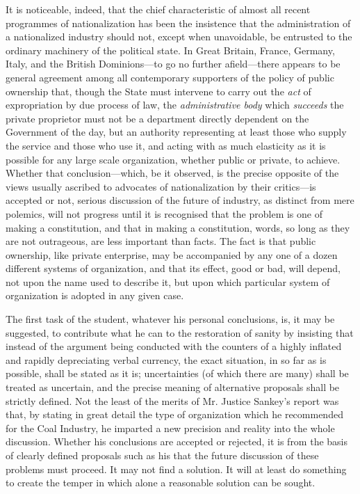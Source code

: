 \documentclass{book}
\begin{document}
It is noticeable, indeed, that the chief characteristic of almost all recent programmes of nationalization has been the insistence that the administration of a nationalized industry should not, except when unavoidable, be entrusted to the ordinary machinery of the political state. In Great Britain, France, Germany, Italy, and the British Dominions—to go no further afield—there appears to be general agreement among all contemporary supporters of the policy of public ownership that, though the State must intervene to carry out the \emph{act} of expropriation by due process of law, the \emph{administrative body} which \emph{succeeds} the private proprietor must not be a department directly dependent on the Government of the day, but an authority representing at least those who supply the service and those who use it, and acting with as much elasticity as it is possible for any large scale organization, whether public or private, to achieve. Whether that conclusion—which, be it observed, is the precise opposite of the views usually ascribed to advocates of nationalization by their critics—is accepted or not, serious discussion of the future of industry, as distinct from mere polemics, will not progress until it is recognised that the problem is one of making a constitution, and that in making a constitution, words, so long as they are not outrageous, are less important than facts. The fact is that public ownership, like private enterprise, may be accompanied by any one of a dozen different systems of organization, and that its effect, good or bad, will depend, not upon the name used to describe it, but upon which particular system of organization is adopted in any given case.

The first task of the student, whatever his personal conclusions, is, it may be suggested, to contribute what he can to the restoration of sanity by insisting that instead of the argument being conducted with the counters of a highly inflated and rapidly depreciating verbal currency, the exact situation, in so far as is possible, shall be stated as it is; uncertainties (of which there are many) shall be treated as uncertain, and the precise meaning of alternative proposals shall be strictly defined. Not the least of the merits of Mr. Justice Sankey’s report was that, by stating in great detail the type of organization which he recommended for the Coal Industry, he imparted a new precision and reality into the whole discussion. Whether his conclusions are accepted or rejected, it is from the basis of clearly defined proposals such as his that the future discussion of these problems must proceed. It may not find a solution. It will at least do something to create the temper in which alone a reasonable solution can be sought.
\end{document}
